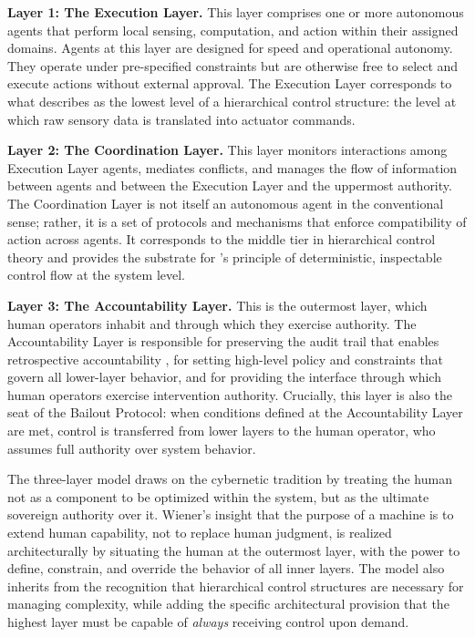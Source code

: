 \textbf{Layer 1: The Execution Layer.} This layer comprises one or more autonomous agents that perform local sensing, computation, and action within their assigned domains. Agents at this layer are designed for speed and operational autonomy. They operate under pre-specified constraints but are otherwise free to select and execute actions without external approval. The Execution Layer corresponds to what \cite{tristr81} describes as the lowest level of a hierarchical control structure: the level at which raw sensory data is translated into actuator commands.

\textbf{Layer 2: The Coordination Layer.} This layer monitors interactions among Execution Layer agents, mediates conflicts, and manages the flow of information between agents and between the Execution Layer and the uppermost authority. The Coordination Layer is not itself an autonomous agent in the conventional sense; rather, it is a set of protocols and mechanisms that enforce compatibility of action across agents. It corresponds to the middle tier in hierarchical control theory \cite{tristr81} and provides the substrate for \cite{dijkstra1982}'s principle of deterministic, inspectable control flow at the system level.

\textbf{Layer 3: The Accountability Layer.} This is the outermost layer, which human operators inhabit and through which they exercise authority. The Accountability Layer is responsible for preserving the audit trail that enables retrospective accountability \cite{bansal2019}, for setting high-level policy and constraints that govern all lower-layer behavior, and for providing the interface through which human operators exercise intervention authority. Crucially, this layer is also the seat of the Bailout Protocol: when conditions defined at the Accountability Layer are met, control is transferred from lower layers to the human operator, who assumes full authority over system behavior.

The three-layer model draws on the cybernetic tradition \cite{wiener1948} by treating the human not as a component to be optimized within the system, but as the ultimate sovereign authority over it. Wiener's insight that the purpose of a machine is to extend human capability, not to replace human judgment, is realized architecturally by situating the human at the outermost layer, with the power to define, constrain, and override the behavior of all inner layers. The model also inherits from \cite{tristr81} the recognition that hierarchical control structures are necessary for managing complexity, while adding the specific architectural provision that the highest layer must be capable of \textit{always} receiving control upon demand.

